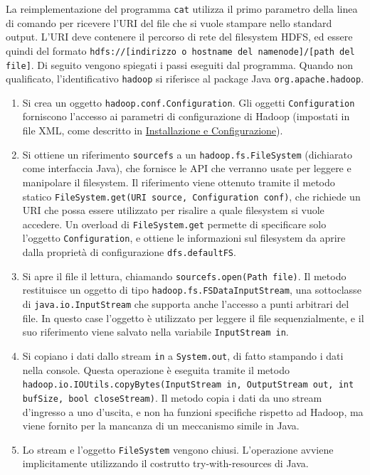 \documentclass[italian,a4paper, twoside, 12pt]{report}
\begin{document}
La reimplementazione del programma \lstinline!cat! utilizza il primo
parametro della linea di comando per ricevere l'URI del file che si
vuole stampare nello standard output. L'URI deve contenere il percorso
di rete del filesystem HDFS, ed essere quindi del formato
\lstinline!hdfs://[indirizzo o hostname del namenode]/[path del file]!.
Di seguito vengono spiegati i passi eseguiti dal programma. Quando non
qualificato, l'identificativo \lstinline!hadoop! si riferisce al package
Java \lstinline!org.apache.hadoop!.

\begin{enumerate}
\item
  Si crea un oggetto \lstinline!hadoop.conf.Configuration!. Gli oggetti
  \lstinline!Configuration! forniscono l'accesso ai parametri di
  configurazione di Hadoop (impostati in file XML, come descritto in
  \protect\hyperlink{installazione-e-configurazione}{Installazione e
  Configurazione}).
\item
  Si ottiene un riferimento \lstinline!sourcefs! a un
  \lstinline!hadoop.fs.FileSystem! (dichiarato come interfaccia Java),
  che fornisce le API che verranno usate per leggere e manipolare il
  filesystem. Il riferimento viene ottenuto tramite il metodo statico
  \lstinline!FileSystem.get(URI source, Configuration conf)!, che
  richiede un URI che possa essere utilizzato per risalire a quale
  filesystem si vuole accedere. Un overload di
  \lstinline!FileSystem.get! permette di specificare solo l'oggetto
  \lstinline!Configuration!, e ottiene le informazioni sul filesystem da
  aprire dalla proprietà di configurazione \lstinline!dfs.defaultFS!.
\item
  Si apre il file il lettura, chiamando
  \lstinline!sourcefs.open(Path file)!. Il metodo restituisce un oggetto
  di tipo \lstinline!hadoop.fs.FSDataInputStream!, una sottoclasse di
  \lstinline!java.io.InputStream! che supporta anche l'accesso a punti
  arbitrari del file. In questo case l'oggetto è utilizzato per leggere
  il file sequenzialmente, e il suo riferimento viene salvato nella
  variabile \lstinline!InputStream in!.
\item
  Si copiano i dati dallo stream \lstinline!in! a
  \lstinline!System.out!, di fatto stampando i dati nella console.
  Questa operazione è eseguita tramite il metodo
  \lstinline!hadoop.io.IOUtils.copyBytes(InputStream in, OutputStream out, int bufSize, bool closeStream)!.
  Il metodo copia i dati da uno stream d'ingresso a uno d'uscita, e non
  ha funzioni specifiche rispetto ad Hadoop, ma viene fornito per la
  mancanza di un meccanismo simile in Java.
\item
  Lo stream e l'oggetto \lstinline!FileSystem! vengono chiusi.
  L'operazione avviene implicitamente utilizzando il costrutto
  try-with-resources di Java.
\end{enumerate}
\end{document}
